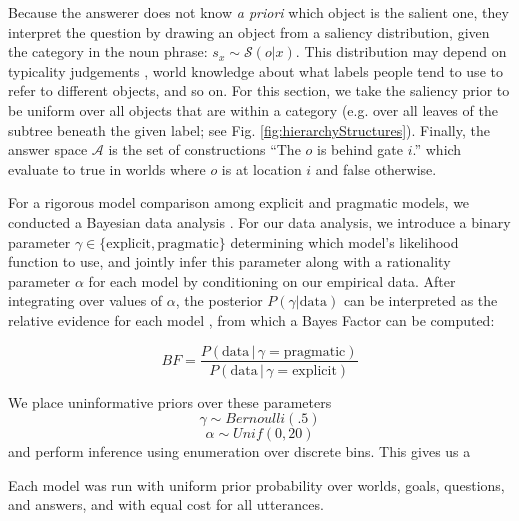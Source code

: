 \documentclass[12pt, floatsintext, jou]{apa6}
\begin{document}
Because the answerer does not know \emph{a priori} which object is the salient one, they interpret the question by drawing an object from a saliency distribution, given the category in the noun phrase: $s_x \sim \mathcal{S}(o | x)$. This distribution may depend on typicality judgements \cite{Rosch75}, world knowledge about what labels people tend to use to refer to different objects, and so on. For this section, we take the saliency prior to be uniform over all objects that are within a category (e.g. over all leaves of the subtree beneath the given label; see Fig. \ref{fig:hierarchyStructures}). Finally, the answer space $\mathcal{A}$ is the set of constructions ``The $o$ is behind gate $i$.'' which evaluate to true in worlds where $o$ is at location $i$ and false otherwise.  %

For a rigorous model comparison among explicit and pragmatic models, we conducted a Bayesian data analysis \cite{LeeWagenmakers14_BDA}. For our data analysis, we introduce a binary parameter $\gamma \in \{\textrm{explicit}, \textrm{pragmatic}\}$  determining which model's likelihood function to use, and jointly infer this parameter along with a rationality parameter $\alpha$ for each model by conditioning on our empirical data. After integrating over values of $\alpha$, the posterior $P(\gamma | \textrm{data})$ can be interpreted as the relative evidence for each model \cite{KruschkeVanPaemel15_OxfordHandbook}, from which a Bayes Factor can be computed:

$$BF = \frac{P(\textrm{data}\, |\, \gamma = \textrm{pragmatic})}{P(\textrm{data}\, |\, \gamma = \textrm{explicit})}$$

We place uninformative priors over these parameters $$\gamma \sim Bernoulli(.5)$$ $$\alpha \sim Unif(0,20)$$ and perform inference using enumeration over discrete bins. This gives us a 

 Each model was run with uniform prior probability over worlds, goals, questions, and answers, and with equal cost for all utterances. 
\end{document}
